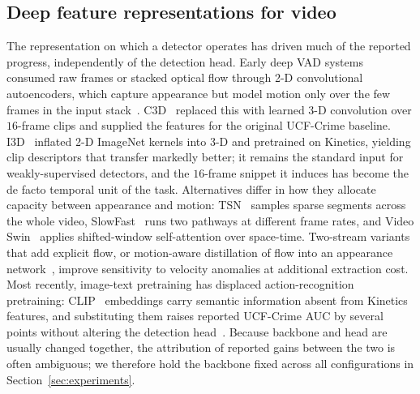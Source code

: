 \documentclass[11pt]{article}
\begin{document}
\subsection{Deep feature representations for video}
The representation on which a detector operates has driven much of the reported
progress, independently of the detection head. Early deep VAD systems consumed
raw frames or stacked optical flow through 2-D convolutional autoencoders, which
capture appearance but model motion only over the few frames in the input
stack~\citep{hasan2016learning}. C3D~\citep{tran2015learning} replaced this with
learned 3-D convolution over $16$-frame clips and supplied the features for the
original UCF-Crime baseline. I3D~\citep{carreira2017quo} inflated 2-D ImageNet
kernels into 3-D and pretrained on Kinetics, yielding clip descriptors that
transfer markedly better; it remains the standard input for weakly-supervised
detectors, and the $16$-frame snippet it induces has become the de facto temporal
unit of the task. Alternatives differ in how they allocate capacity between
appearance and motion: TSN~\citep{wang2016temporal} samples sparse segments across
the whole video, SlowFast~\citep{feichtenhofer2019slowfast} runs two pathways at
different frame rates, and Video Swin~\citep{liu2022video} applies shifted-window
self-attention over space-time. Two-stream variants that add explicit flow, or
motion-aware distillation of flow into an appearance
network~\citep{zhu2019motion}, improve sensitivity to velocity anomalies at
additional extraction cost. Most recently, image-text pretraining has displaced
action-recognition pretraining: CLIP~\citep{radford2021learning} embeddings carry
semantic information absent from Kinetics features, and substituting them raises
reported UCF-Crime AUC by several points without altering the detection
head~\citep{joo2023clip,wu2024vadclip}. Because backbone and head are usually
changed together, the attribution of reported gains between the two is often
ambiguous; we therefore hold the backbone fixed across all configurations in
Section~\ref{sec:experiments}.
\end{document}
